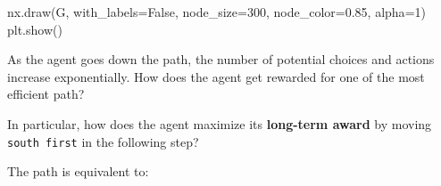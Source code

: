 \documentclass[
  letterpaper,
]{scrbook}
\newenvironment{Shaded}{\begin{snugshade}}{\end{snugshade}}
\newcommand{\DecValTok}[1]{\textcolor[rgb]{0.68,0.00,0.00}{#1}}
\newcommand{\NormalTok}[1]{\textcolor[rgb]{0.00,0.23,0.31}{#1}}
\newcommand{\OperatorTok}[1]{\textcolor[rgb]{0.37,0.37,0.37}{#1}}
\newcommand{\StringTok}[1]{\textcolor[rgb]{0.13,0.47,0.30}{#1}}
\newcommand{\VariableTok}[1]{\textcolor[rgb]{0.07,0.07,0.07}{#1}}
\begin{document}
\begin{Shaded}
\begin{Highlighting}[]
\NormalTok{nx.draw(G, with\_labels}\OperatorTok{=}\VariableTok{False}\NormalTok{, node\_size}\OperatorTok{=}\DecValTok{300}\NormalTok{, node\_color}\OperatorTok{=}\StringTok{\textquotesingle{}0.85\textquotesingle{}}\NormalTok{, alpha}\OperatorTok{=}\DecValTok{1}\NormalTok{)}
\NormalTok{plt.show()}
\end{Highlighting}
\end{Shaded}

As the agent goes down the path, the number of potential choices and
actions increase exponentially. How does the agent get rewarded for one
of the most efficient path?

In particular, how does the agent maximize its \textbf{long-term award}
by moving \texttt{south\ first} in the following step?

The path is equivalent to:
\end{document}
